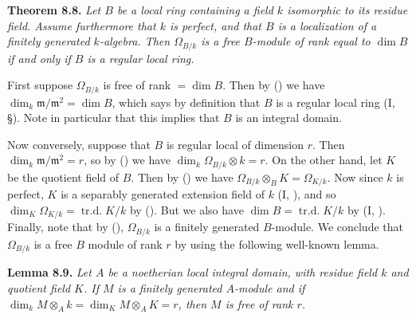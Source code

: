 {\medskip
\noindent\hypertarget{result-II-8.8}{}\textbf{Theorem 8.8.} \emph{Let $B$ be a local ring containing a field $k$ isomorphic to its residue field. Assume furthermore that $k$ is perfect, and that $B$ is a localization of a finitely generated $k$-algebra. Then $\Omega_{B/k}$ is a free $B$-module of rank equal to \textup{$\dim B$} if and only if $B$ is a regular local ring.}

\Proof First suppose $\Omega_{B/k}$ is free of rank $=\dim B$. Then by () we have $\dim_k\mathfrak m/\mathfrak m^2=\dim B$, which says by definition that $B$ is a regular local ring (I, \S{}). Note in particular that this implies that $B$ is an integral domain.

Now conversely, suppose that $B$ is regular local of dimension $r$. Then $\dim_k\mathfrak m/\mathfrak m^2=r$, so by () we have $\dim_k\Omega_{B/k}\otimes k=r$. On the other hand, let $K$ be the quotient field of $B$. Then by () we have $\Omega_{B/k}\otimes_B K=\Omega_{K/k}$. Now since $k$ is perfect, $K$ is a separably generated extension field of $k$ (I, ), and so $\dim_K\Omega_{K/k}=\operatorname{tr.d.}K/k$ by (). But we also have $\dim B=\operatorname{tr.d.}K/k$ by (I, ). Finally, note that by (), $\Omega_{B/k}$ is a finitely generated $B$-module. We conclude that $\Omega_{B/k}$ is a free $B$ module of rank $r$ by using the following well-known lemma.

\medskip
\noindent\hypertarget{result-II-8.9}{}\textbf{Lemma 8.9.} \emph{Let $A$ be a noetherian local integral domain, with residue field $k$ and quotient field $K$. If $M$ is a finitely generated $A$-module and if $\dim_k M\otimes_A k=\dim_K M\otimes_A K=r$, then $M$ is free of rank $r$.}
}
